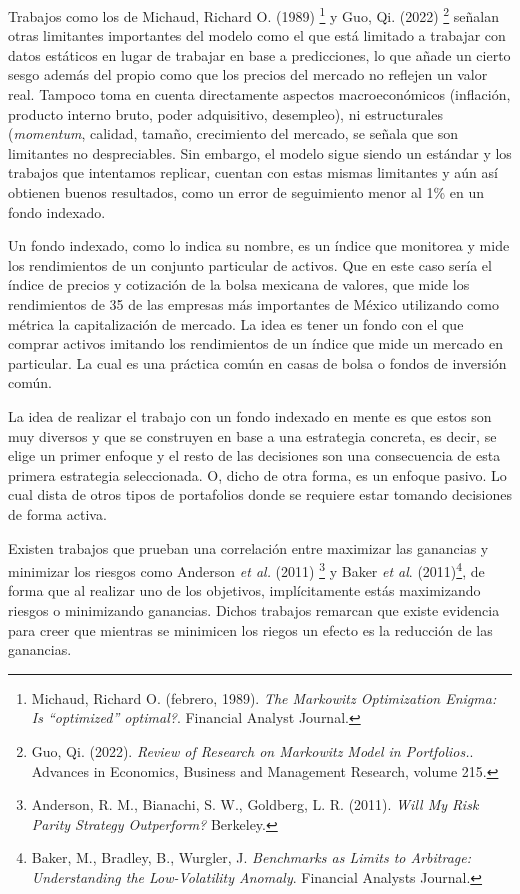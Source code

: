 \documentclass[
]{article}
\begin{document}
Trabajos como los de Michaud, Richard O. (1989) \footnote{Michaud, Richard O. (febrero,
1989). \emph{The Markowitz Optimization Enigma: Is “optimized” optimal?}. Financial Analyst Journal.}
y Guo, Qi. (2022) \footnote{Guo, Qi. (2022). \emph{Review of Research on
Markowitz Model in Portfolios.}. Advances in Economics, Business and Management
Research, volume 215.} señalan otras limitantes importantes del modelo como el
que está limitado a trabajar con datos estáticos en lugar de trabajar en base a
predicciones, lo que añade un cierto sesgo además del propio como que los precios
del mercado no reflejen un valor real. Tampoco toma en cuenta directamente
aspectos macroeconómicos (inflación, producto interno bruto, poder adquisitivo,
desempleo), ni estructurales (\emph{momentum}, calidad, tamaño, crecimiento del
mercado, se señala que son limitantes no despreciables. Sin embargo, el modelo
sigue siendo un estándar y los trabajos que intentamos replicar, cuentan con estas
mismas limitantes y aún así obtienen buenos resultados, como un error de
seguimiento menor al 1\% en un fondo indexado.

Un fondo indexado, como lo indica su nombre, es un índice que monitorea
y mide los rendimientos de un conjunto particular de activos. Que en
este caso sería el índice de precios y cotización de la bolsa mexicana
de valores, que mide los rendimientos de 35 de las empresas más
importantes de México utilizando como métrica la capitalización de
mercado. La idea es tener un fondo con el que comprar activos imitando
los rendimientos de un índice que mide un mercado en particular. La cual
es una práctica común en casas de bolsa o fondos de inversión común.

La idea de realizar el trabajo con un fondo indexado en mente es que
estos son muy diversos y que se construyen en base a una estrategia
concreta, es decir, se elige un primer enfoque y el resto de las
decisiones son una consecuencia de esta primera estrategia seleccionada.
O, dicho de otra forma, es un enfoque pasivo. Lo cual dista de otros
tipos de portafolios donde se requiere estar tomando decisiones de forma
activa.

Existen trabajos que prueban una correlación entre maximizar las
ganancias y minimizar los riesgos como Anderson \emph{et al.} (2011)
\footnote{Anderson, R. M., Bianachi, S. W., Goldberg, L. R. (2011). 
\emph{Will My Risk Parity Strategy Outperform?} Berkeley.} y Baker 
\emph{et al}. (2011)\footnote{Baker, M., Bradley, B., Wurgler, J.
\emph{ Benchmarks as Limits to Arbitrage: Understanding the Low-Volatility Anomaly}. 
Financial Analysts Journal.}, de forma que al realizar uno de los
objetivos, implícitamente estás maximizando riesgos o minimizando
ganancias. Dichos trabajos remarcan que existe evidencia para creer que
mientras se minimicen los riegos un efecto es la reducción de las
ganancias.
\end{document}
